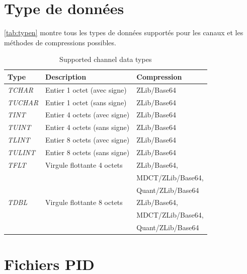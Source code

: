 \documentclass[a4paper,12pt,BCOR6mm,bibtotoc,idxtotoc]{scrbook}
\begin{document}

\chapter{Type de donn\'ees}
\label{sec:apx_types}

\autoref{tab:typen} montre tous les types de donn\'ees support\'es pour les canaux et les m\'ethodes de compressions possibles.

\begin{table}[htb]
  \centering
  \caption{Supported channel data types}
  \label{tab:typen} \vspace{1.5ex}
  \begin{tabular}[thb]{|l|l|l|}
    \hline
    \textbf{Type}   & \textbf{Description}         & \textbf{Compression}\\ \hline
    \textit{TCHAR}  & Entier 1 octet (avec signe)  & ZLib/Base64\\ \hline
    \textit{TUCHAR} & Entier 1 octet (sans signe)  & ZLib/Base64\\ \hline
    \textit{TINT}   & Entier 4 octets (avec signe) & ZLib/Base64\\ \hline
    \textit{TUINT}  & Entier 4 octets (sans signe) & ZLib/Base64\\ \hline
    \textit{TLINT}  & Entier 8 octets (avec signe) & ZLib/Base64\\ \hline
    \textit{TULINT} & Entier 8 octets (sans signe) & ZLib/Base64\\ \hline
    \textit{TFLT}   & Virgule flottante 4 octets & ZLib/Base64,\\
                    &                            & MDCT/ZLib/Base64,\\
                    &                            & Quant/ZLib/Base64\\ \hline
    \textit{TDBL}   & Virgule flottante 8 octets & ZLib/Base64,\\
                    &                            & MDCT/ZLib/Base64,\\
                    &                            & Quant/ZLib/Base64\\ \hline
  \end{tabular}
\end{table}


\chapter{Fichiers PID} \label{sec:apx_pid}
\end{document}
